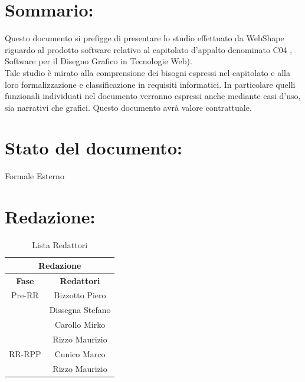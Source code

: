 \section*{\LARGE Sommario:} %
Questo documento si prefigge di presentare lo studio effettuato da WebShape riguardo al prodotto software relativo al capitolato d'appalto denominato C04 {\ajax}, Software per il Disegno Grafico in Tecnologie Web).\\
Tale studio \`e mirato alla comprensione dei bisogni espressi nel capitolato e alla loro formalizzazione e classificazione in requisiti informatici. In particolare quelli funzionali individuati nel documento verranno espressi anche mediante casi d'uso, sia narrativi che grafici. Questo documento avr\`a valore contrattuale.

\section*{\LARGE Stato del documento:}
	Formale Esterno
\hangindent=0pt

\section*{\LARGE Redazione:}
	\begin{table}[!h]
		\begin{center}
			\begin{tabular}
				{|c|c|}
				\hline
				\multicolumn{2}{|c|}{ \textbf{Redazione} } \\
				\hline
				\textbf{Fase} & \textbf{Redattori} \\
				\hline
				\multirow{1}{*}{Pre-RR} & Bizzotto Piero\\
										& Dissegna Stefano\\
										& Carollo Mirko\\
                                                                                & Rizzo Maurizio\\
				\hline
				\multirow{1}{*}{RR-RPP} & Cunico Marco\\
                                                        & Rizzo Maurizio\\
				\hline
			\end{tabular}
			\caption{Lista Redattori} %
			\label{tabredazione}
		\end{center}
	\end{table}	

